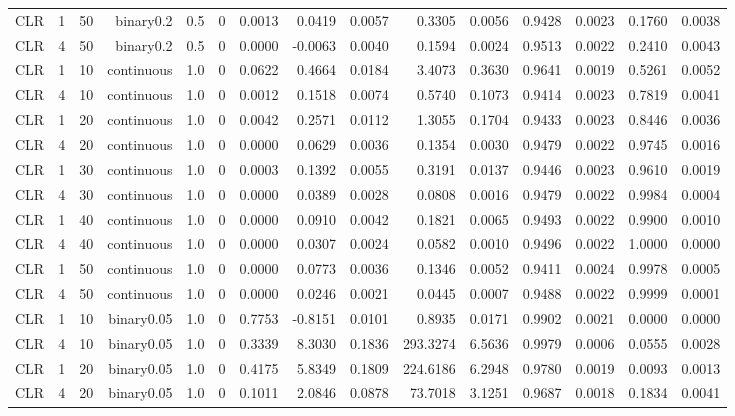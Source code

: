 \begin{longtable}{rrrrrrrrrrrrrrr}
  CLR & 1 & 50 & binary0.2 & 0.5 & 0 & 0.0013 & 0.0419 & 0.0057 & 0.3305 & 0.0056 & 0.9428 & 0.0023 & 0.1760 & 0.0038 \\ 
  CLR & 4 & 50 & binary0.2 & 0.5 & 0 & 0.0000 & -0.0063 & 0.0040 & 0.1594 & 0.0024 & 0.9513 & 0.0022 & 0.2410 & 0.0043 \\ 
  CLR & 1 & 10 & continuous & 1.0 & 0 & 0.0622 & 0.4664 & 0.0184 & 3.4073 & 0.3630 & 0.9641 & 0.0019 & 0.5261 & 0.0052 \\ 
  CLR & 4 & 10 & continuous & 1.0 & 0 & 0.0012 & 0.1518 & 0.0074 & 0.5740 & 0.1073 & 0.9414 & 0.0023 & 0.7819 & 0.0041 \\ 
  CLR & 1 & 20 & continuous & 1.0 & 0 & 0.0042 & 0.2571 & 0.0112 & 1.3055 & 0.1704 & 0.9433 & 0.0023 & 0.8446 & 0.0036 \\ 
  CLR & 4 & 20 & continuous & 1.0 & 0 & 0.0000 & 0.0629 & 0.0036 & 0.1354 & 0.0030 & 0.9479 & 0.0022 & 0.9745 & 0.0016 \\ 
  CLR & 1 & 30 & continuous & 1.0 & 0 & 0.0003 & 0.1392 & 0.0055 & 0.3191 & 0.0137 & 0.9446 & 0.0023 & 0.9610 & 0.0019 \\ 
  CLR & 4 & 30 & continuous & 1.0 & 0 & 0.0000 & 0.0389 & 0.0028 & 0.0808 & 0.0016 & 0.9479 & 0.0022 & 0.9984 & 0.0004 \\ 
  CLR & 1 & 40 & continuous & 1.0 & 0 & 0.0000 & 0.0910 & 0.0042 & 0.1821 & 0.0065 & 0.9493 & 0.0022 & 0.9900 & 0.0010 \\ 
  CLR & 4 & 40 & continuous & 1.0 & 0 & 0.0000 & 0.0307 & 0.0024 & 0.0582 & 0.0010 & 0.9496 & 0.0022 & 1.0000 & 0.0000 \\ 
  CLR & 1 & 50 & continuous & 1.0 & 0 & 0.0000 & 0.0773 & 0.0036 & 0.1346 & 0.0052 & 0.9411 & 0.0024 & 0.9978 & 0.0005 \\ 
  CLR & 4 & 50 & continuous & 1.0 & 0 & 0.0000 & 0.0246 & 0.0021 & 0.0445 & 0.0007 & 0.9488 & 0.0022 & 0.9999 & 0.0001 \\ 
  CLR & 1 & 10 & binary0.05 & 1.0 & 0 & 0.7753 & -0.8151 & 0.0101 & 0.8935 & 0.0171 & 0.9902 & 0.0021 & 0.0000 & 0.0000 \\ 
  CLR & 4 & 10 & binary0.05 & 1.0 & 0 & 0.3339 & 8.3030 & 0.1836 & 293.3274 & 6.5636 & 0.9979 & 0.0006 & 0.0555 & 0.0028 \\ 
  CLR & 1 & 20 & binary0.05 & 1.0 & 0 & 0.4175 & 5.8349 & 0.1809 & 224.6186 & 6.2948 & 0.9780 & 0.0019 & 0.0093 & 0.0013 \\ 
  CLR & 4 & 20 & binary0.05 & 1.0 & 0 & 0.1011 & 2.0846 & 0.0878 & 73.7018 & 3.1251 & 0.9687 & 0.0018 & 0.1834 & 0.0041 \\ 

\end{longtable}
